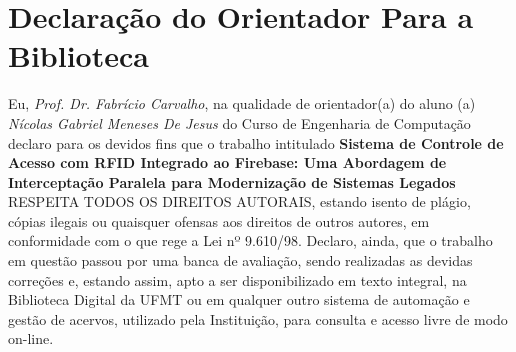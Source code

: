 
\label{Cap:apendice}

\section{Declaração do Orientador Para a Biblioteca}

Eu,  \textit{Prof. Dr. Fabrício Carvalho},  na  qualidade  de orientador(a) do aluno (a) \textit{Nícolas Gabriel Meneses De Jesus} do Curso de Engenharia de Computação  declaro  para  os  devidos  fins  que  o  trabalho  intitulado \textbf{Sistema de Controle de Acesso com RFID Integrado ao Firebase: Uma Abordagem de Interceptação Paralela para Modernização de Sistemas Legados} RESPEITA TODOS  OS  DIREITOS  AUTORAIS,  estando  isento  de  plágio,  cópias  ilegais  ou quaisquer ofensas aos direitos de outros autores, em conformidade com o que rege a Lei nº 9.610/98. Declaro, ainda, que o trabalho em questão passou por uma banca de  avaliação,  sendo  realizadas  as  devidas  correções  e,  estando  assim,  apto  a  ser disponibilizado em texto integral, na Biblioteca Digital da UFMT ou em qualquer outro sistema de automação e gestão de acervos, utilizado pela Instituição, para consulta e acesso livre de modo on-line.
